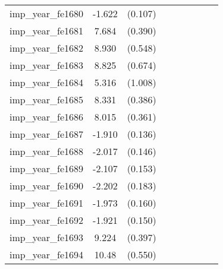 {\begin{tabular}{l*{4}{cc}}
imp\_year\_fe1680&   -1.622\sym{***}&  (0.107)&                  &         &                  &         &                  &         \\
imp\_year\_fe1681&    7.684\sym{***}&  (0.390)&                  &         &                  &         &                  &         \\
imp\_year\_fe1682&    8.930\sym{***}&  (0.548)&                  &         &                  &         &                  &         \\
imp\_year\_fe1683&    8.825\sym{***}&  (0.674)&                  &         &                  &         &                  &         \\
imp\_year\_fe1684&    5.316\sym{***}&  (1.008)&                  &         &                  &         &                  &         \\
imp\_year\_fe1685&    8.331\sym{***}&  (0.386)&                  &         &                  &         &                  &         \\
imp\_year\_fe1686&    8.015\sym{***}&  (0.361)&                  &         &                  &         &                  &         \\
imp\_year\_fe1687&   -1.910\sym{***}&  (0.136)&                  &         &                  &         &                  &         \\
imp\_year\_fe1688&   -2.017\sym{***}&  (0.146)&                  &         &                  &         &                  &         \\
imp\_year\_fe1689&   -2.107\sym{***}&  (0.153)&                  &         &                  &         &                  &         \\
imp\_year\_fe1690&   -2.202\sym{***}&  (0.183)&                  &         &                  &         &                  &         \\
imp\_year\_fe1691&   -1.973\sym{***}&  (0.160)&                  &         &                  &         &                  &         \\
imp\_year\_fe1692&   -1.921\sym{***}&  (0.150)&                  &         &                  &         &                  &         \\
imp\_year\_fe1693&    9.224\sym{***}&  (0.397)&                  &         &                  &         &                  &         \\
imp\_year\_fe1694&    10.48\sym{***}&  (0.550)&                  &         &                  &         &                  &         \\

\end{tabular}}
